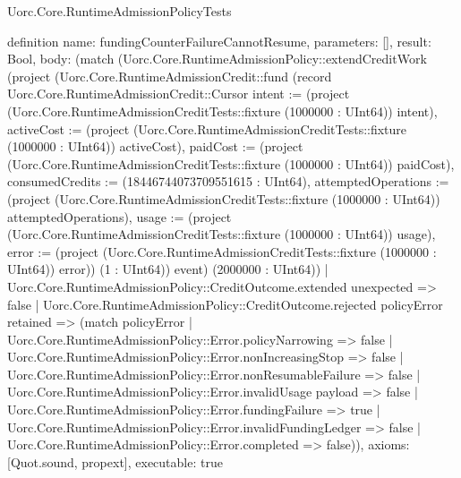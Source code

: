 \begin{lexlean}{Uorc.Core.RuntimeAdmissionPolicyTests}
\begin{semanticmodule}
definition{
  name: fundingCounterFailureCannotResume,
  parameters: [],
  result: Bool,
  body: (match (Uorc.Core.RuntimeAdmissionPolicy::extendCreditWork (project (Uorc.Core.RuntimeAdmissionCredit::fund (record Uorc.Core.RuntimeAdmissionCredit::Cursor {intent := (project (Uorc.Core.RuntimeAdmissionCreditTests::fixture (1000000 : UInt64)) intent), activeCost := (project (Uorc.Core.RuntimeAdmissionCreditTests::fixture (1000000 : UInt64)) activeCost), paidCost := (project (Uorc.Core.RuntimeAdmissionCreditTests::fixture (1000000 : UInt64)) paidCost), consumedCredits := (18446744073709551615 : UInt64), attemptedOperations := (project (Uorc.Core.RuntimeAdmissionCreditTests::fixture (1000000 : UInt64)) attemptedOperations), usage := (project (Uorc.Core.RuntimeAdmissionCreditTests::fixture (1000000 : UInt64)) usage), error := (project (Uorc.Core.RuntimeAdmissionCreditTests::fixture (1000000 : UInt64)) error)}) (1 : UInt64)) event) (2000000 : UInt64))
    | Uorc.Core.RuntimeAdmissionPolicy::CreditOutcome.extended unexpected => false
    | Uorc.Core.RuntimeAdmissionPolicy::CreditOutcome.rejected policyError retained => (match policyError
      | Uorc.Core.RuntimeAdmissionPolicy::Error.policyNarrowing => false
      | Uorc.Core.RuntimeAdmissionPolicy::Error.nonIncreasingStop => false
      | Uorc.Core.RuntimeAdmissionPolicy::Error.nonResumableFailure => false
      | Uorc.Core.RuntimeAdmissionPolicy::Error.invalidUsage payload => false
      | Uorc.Core.RuntimeAdmissionPolicy::Error.fundingFailure => true
      | Uorc.Core.RuntimeAdmissionPolicy::Error.invalidFundingLedger => false
      | Uorc.Core.RuntimeAdmissionPolicy::Error.completed => false)),
  axioms: [Quot.sound, propext],
  executable: true
}


\end{semanticmodule}
\end{lexlean}
